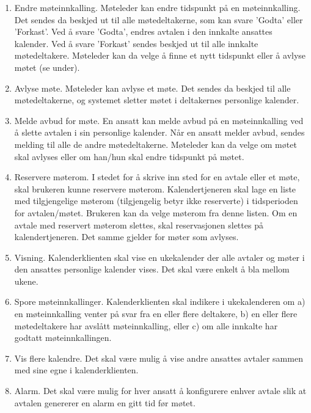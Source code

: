 \documentclass[a4paper]{scrartcl}
\begin{document}
\begin{enumerate}
\item
Endre møteinnkalling. Møteleder kan endre tidspunkt på en møteinnkalling. Det sendes da beskjed ut til alle møtedeltakerne, som kan svare 'Godta' eller 'Forkast'. Ved å svare 'Godta', endres avtalen i den innkalte ansattes kalender. Ved å svare 'Forkast' sendes beskjed ut til alle innkalte møtedeltakere. Møteleder kan da velge å finne et nytt tidspunkt eller å avlyse møtet (se under).

\item
Avlyse møte. Møteleder kan avlyse et møte. Det sendes da beskjed til alle møtedeltakerne, og systemet sletter møtet i deltakernes personlige kalender.

\item
Melde avbud for møte. En ansatt kan melde avbud på en møteinnkalling ved å slette avtalen i sin personlige kalender. Når en ansatt melder avbud, sendes melding til alle de andre møtedeltakerne. Møteleder kan da velge om møtet skal avlyses eller om han/hun skal endre tidspunkt på møtet.

\item
Reservere møterom. I stedet for å skrive inn sted for en avtale eller et møte, skal brukeren kunne reservere møterom. Kalendertjeneren skal lage en liste med tilgjengelige møterom (tilgjengelig betyr ikke reserverte) i tidsperioden for avtalen/møtet. Brukeren kan da velge møterom fra denne listen. Om en avtale med reservert møterom slettes, skal reservasjonen slettes på kalendertjeneren. Det samme gjelder for møter som avlyses.

\item
Visning. Kalenderklienten skal vise en ukekalender der alle avtaler og møter i den ansattes personlige kalender vises. Det skal være enkelt å bla mellom ukene.

\item
Spore møteinnkallinger. Kalenderklienten skal indikere i ukekalenderen om a) en møteinnkalling venter på svar fra en eller flere deltakere, b) en eller flere møtedeltakere har avslått møteinnkalling, eller c) om alle innkalte har godtatt møteinnkallingen.

\item
Vis flere kalendre. Det skal være mulig å vise andre ansattes avtaler sammen med sine egne i kalenderklienten.

\item
Alarm. Det skal være mulig for hver ansatt å konfigurere enhver avtale slik at avtalen genererer en alarm en gitt tid før møtet. 

\end{enumerate}
\end{document}
